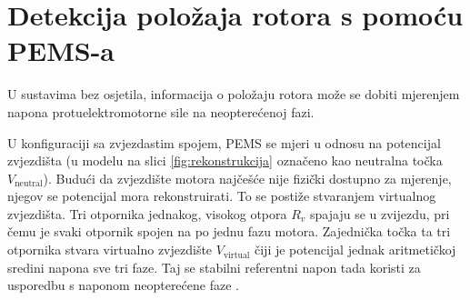 \documentclass[diplomskirad]{fer}
\begin{document}
\section{Detekcija položaja rotora s pomoću PEMS-a}

U sustavima bez osjetila, informacija o položaju rotora može se dobiti
mjerenjem napona protuelektromotorne sile na neopterećenoj fazi.

U konfiguraciji sa zvjezdastim spojem, PEMS se mjeri u odnosu na potencijal
zvjezdišta (u modelu na slici \ref{fig:rekonstrukcija} označeno kao neutralna
točka $V_{\text{neutral}}$). Budući da zvjezdište motora najčešće nije fizički
dostupno za mjerenje, njegov se potencijal mora rekonstruirati. To se postiže
stvaranjem virtualnog zvjezdišta. Tri otpornika jednakog, visokog otpora $R_v$
spajaju se u zvijezdu, pri čemu je svaki otpornik spojen na po jednu fazu
motora. Zajednička točka ta tri otpornika stvara virtualno zvjezdište
$V_{\text{virtual}}$ čiji je potencijal jednak aritmetičkoj sredini napona sve
tri faze. Taj se stabilni referentni napon tada koristi za usporedbu s naponom
neopterećene faze \cite{ST_AN1946}.
\end{document}
